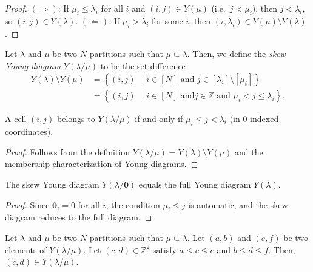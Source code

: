 \begin{proof}
\leanok
$(\Rightarrow)$: If $\mu_i \le \lambda_i$ for all $i$ and $(i,j) \in Y(\mu)$
(i.e.\ $j < \mu_i$), then $j < \lambda_i$, so $(i,j) \in Y(\lambda)$.
$(\Leftarrow)$: If $\mu_i > \lambda_i$ for some $i$, then
$(i, \lambda_i) \in Y(\mu) \setminus Y(\lambda)$.
\end{proof}

\begin{definition}
\label{def.sf.skew-diag}
\leantarget
\leanok
Let $\lambda$ and $\mu$ be two $N$-partitions such
that $\mu\subseteq\lambda$. Then, we define the \emph{skew Young diagram}
$Y\left(  \lambda/\mu\right)  $ to be the set difference%
\begin{align*}
Y\left(  \lambda\right)  \setminus Y\left(  \mu\right)   &  =\left\{  \left(
i,j\right)  \ \mid\ i\in\left[  N\right]  \text{ and }j\in\left[  \lambda
_{i}\right]  \setminus\left[  \mu_{i}\right]  \right\} \\
&  =\left\{  \left(  i,j\right)  \ \mid\ i\in\left[  N\right]  \text{ and
}j\in\mathbb{Z}\text{ and }\mu_{i}<j\leq\lambda_{i}\right\}  .
\end{align*}
\end{definition}

\begin{lemma}
\label{lem.sf.skew-diag-mem}
\leanhelper
\leanok
A cell $(i,j)$ belongs to $Y(\lambda/\mu)$ if and only if
$\mu_i \le j < \lambda_i$ (in 0-indexed coordinates).
\end{lemma}

\begin{proof}
\leanok
Follows from the definition $Y(\lambda/\mu) = Y(\lambda) \setminus Y(\mu)$
and the membership characterization of Young diagrams.
\end{proof}

\begin{lemma}
\label{lem.sf.skew-diag-zero}
\leanhelper
\leanok
The skew Young diagram $Y(\lambda/\mathbf{0})$ equals the
full Young diagram $Y(\lambda)$.
\end{lemma}

\begin{proof}
\leanok
Since $\mathbf{0}_i = 0$ for all $i$, the condition $\mu_i \le j$
is automatic, and the skew diagram reduces to the full diagram.
\end{proof}

\begin{lemma}
\label{lem.sf.skew-diag.convexity}
\leantarget
\leanok
Let $\lambda$ and $\mu$ be two $N$-partitions such that $\mu\subseteq\lambda$. Let
$\left(  a,b\right)  $ and $\left(  e,f\right)  $ be two elements of $Y\left(
\lambda/\mu\right)  $. Let $\left(  c,d\right)  \in\mathbb{Z}^{2}$ satisfy
$a\leq c\leq e$ and $b\leq d\leq f$. Then, $\left(  c,d\right)  \in Y\left(
\lambda/\mu\right)  $.
\end{lemma}

